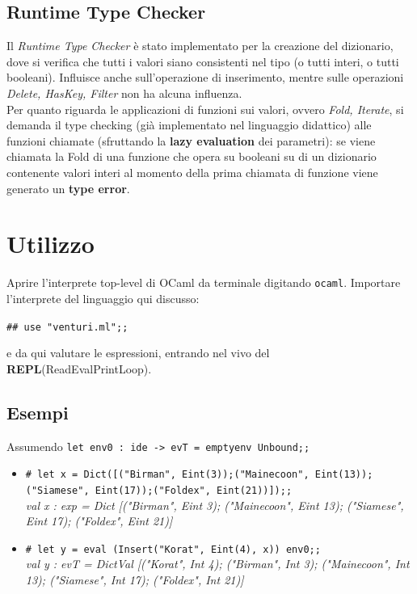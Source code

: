 \documentclass[10pt, a4paper]{article}
\begin{document}
\subsection{Runtime Type Checker}
Il \textit{Runtime Type Checker} è stato implementato per la creazione del dizionario, dove si verifica che tutti i valori siano consistenti nel tipo (o tutti interi, o tutti booleani). Influisce anche sull'operazione di inserimento, mentre sulle operazioni \textit{Delete, HasKey, Filter} non ha alcuna influenza.\\ 
Per quanto riguarda le applicazioni di funzioni sui valori, ovvero \textit{Fold, Iterate}, si demanda il type checking (già implementato nel linguaggio didattico) alle funzioni chiamate (sfruttando la \textbf{lazy evaluation} dei parametri): se viene chiamata la Fold di una funzione che opera su booleani su di un dizionario contenente valori interi al momento della prima chiamata di funzione viene generato un \textbf{type error}.
\section{Utilizzo}
Aprire l'interprete top-level di OCaml da terminale digitando \texttt{ocaml}. Importare l'interprete del linguaggio qui discusso:
\begin{center}
\texttt{\emph{\#}\# use "venturi.ml";;}
\end{center}
e da qui valutare le espressioni, entrando nel vivo del \textbf{REPL}(ReadEvalPrintLoop).
\subsection{Esempi}
Assumendo \texttt{let env0 : ide -> evT = emptyenv Unbound;;}
\begin{itemize}
\item \texttt{\# let x = Dict([("Birman", Eint(3));("Mainecoon", Eint(13));("Siamese", Eint(17));("Foldex", Eint(21))]);;}\\
\textit{val x : exp =
  Dict
   [("Birman", Eint 3); ("Mainecoon", Eint 13); ("Siamese", Eint 17);
    ("Foldex", Eint 21)]
}
\item \texttt{\# let y = eval (Insert("Korat", Eint(4), x)) env0;; }\\
\textit{val y : evT =
  DictVal
   [("Korat", Int 4); ("Birman", Int 3); ("Mainecoon", Int 13);
    ("Siamese", Int 17); ("Foldex", Int 21)]
}
\end{itemize}
\end{document}
